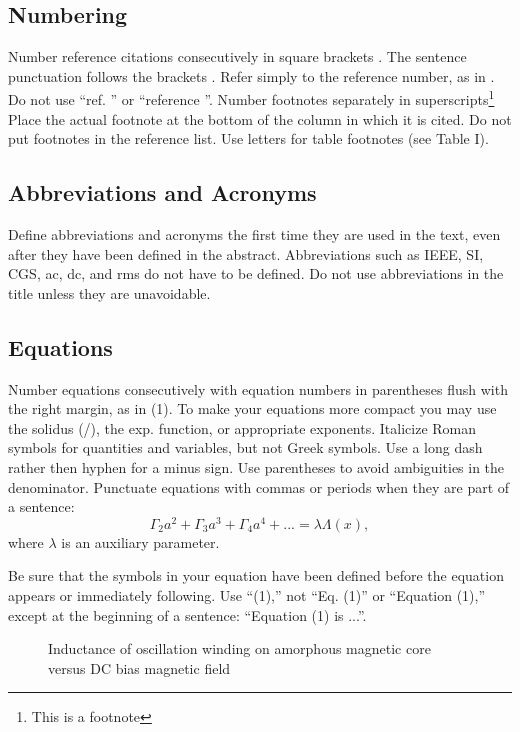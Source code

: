 \documentclass[a4paper, 10pt, conference]{ieeeconf}      %
\begin{document}
\subsection{Numbering}

Number reference citations consecutively in square brackets \cite{c1}.
 The sentence punctuation follows the brackets \cite{c2}.
 Refer simply to the reference number, as in \cite{c3}.
 Do not use ``ref. \cite{c3}'' or ``reference \cite{c3}''.
Number footnotes separately in superscripts\footnote{This is a footnote}
Place the actual footnote at the bottom of the column in which it is cited.
Do not put footnotes in the reference list.
Use letters for table footnotes (see Table I).

\subsection{Abbreviations and Acronyms}

Define abbreviations and acronyms the first time they are used in the text,
even after they have been defined in the abstract. Abbreviations such as
IEEE, SI, CGS, ac, dc, and rms do not have to be defined. Do not use
abbreviations in the title unless they are unavoidable.

\subsection{Equations}

Number equations consecutively with equation numbers in parentheses flush
 with the right margin, as in (1). To make your equations more compact
 you may use the solidus (/), the exp. function, or appropriate exponents.
  Italicize Roman symbols for quantities and variables, but not Greek symbols.
   Use a long dash rather then hyphen for a minus sign. Use parentheses to avoid
    ambiguities in the denominator.
Punctuate equations with commas or periods when they are part of a sentence:
$$\Gamma_2 a^2 + \Gamma_3 a^3 + \Gamma_4 a^4 + ... = \lambda \Lambda(x),$$
where $\lambda$ is an auxiliary parameter.

Be sure that the symbols in your equation have been defined before the
equation appears or immediately following.
Use ``(1),'' not ``Eq. (1)'' or ``Equation (1),''
except at the beginning of a sentence: ``Equation (1) is ...''.

   \begin{figure}[thpb]
      \centering
      \caption{Inductance of oscillation winding on amorphous
       magnetic core versus DC bias magnetic field}
      \label{figurelabel}
   \end{figure}
\end{document}
